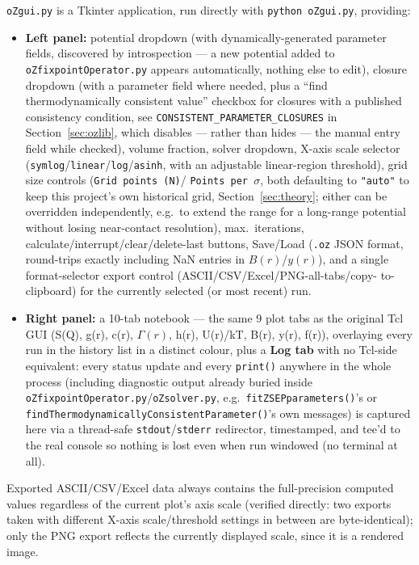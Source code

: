 \documentclass[11pt,a4paper]{article}
\newcommand{\code}[1]{\texttt{#1}}
\begin{document}
\code{oZgui.py} is a Tkinter application, run directly with \code{python
oZgui.py}, providing:
\begin{itemize}[nosep]
  \item \textbf{Left panel:} potential dropdown (with dynamically-generated
    parameter fields, discovered by introspection --- a new potential added to
    \code{oZfixpointOperator.py} appears automatically, nothing else to edit),
    closure dropdown (with a parameter field where needed, plus a ``find
    thermodynamically consistent value'' checkbox for closures with a
    published consistency condition, see
    \code{CONSISTENT\_PARAMETER\_CLOSURES} in Section~\ref{sec:ozlib}, which
    disables --- rather than hides --- the manual entry field while checked),
    volume fraction, solver dropdown, X-axis scale selector
    (\code{symlog}/\code{linear}/\code{log}/\code{asinh}, with an adjustable
    linear-region threshold), grid size controls (\code{Grid points (N)}/
    \code{Points per $\sigma$}, both defaulting to \code{"auto"} to keep this
    project's own historical grid, Section~\ref{sec:theory}; either can be
    overridden independently, e.g.\ to extend the range for a long-range
    potential without losing near-contact resolution), max.\ iterations,
    calculate/interrupt/clear/delete-last buttons, Save/Load (\code{.oz} JSON
    format, round-trips exactly including NaN entries in $B(r)$/$y(r)$), and a
    single format-selector export control (ASCII/CSV/Excel/PNG-all-tabs/copy-
    to-clipboard) for the currently selected (or most recent) run.
  \item \textbf{Right panel:} a 10-tab notebook --- the same 9 plot tabs as the
    original Tcl GUI (S(Q), g(r), c(r), $\Gamma(r)$, h(r), U(r)/kT, B(r), y(r),
    f(r)), overlaying every run in the history list in a distinct colour, plus
    a \textbf{Log tab} with no Tcl-side equivalent: every status update and
    every \code{print()} anywhere in the whole process (including diagnostic
    output already buried inside \code{oZfixpointOperator.py}/\code{oZsolver.py},
    e.g.\ \code{fitZSEPparameters()}'s or
    \code{findThermodynamicallyConsistentParameter()}'s own messages) is
    captured here via a thread-safe \code{stdout}/\code{stderr} redirector,
    timestamped, and tee'd to the real console so nothing is lost even when
    run windowed (no terminal at all).
\end{itemize}
Exported ASCII/CSV/Excel data always contains the full-precision computed
values regardless of the current plot's axis scale (verified directly: two
exports taken with different X-axis scale/threshold settings in between are
byte-identical); only the PNG export reflects the currently displayed scale,
since it is a rendered image.
\end{document}
